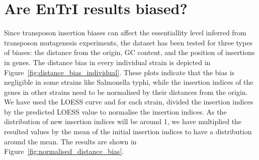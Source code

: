 \documentclass[a4paper,10pt, twocolumn]{article}
\begin{document}
\section{Are EnTrI results biased?}
Since transposon insertion biases can affect the essentiallity level inferred from transposon mutagenesis experiments, the dataset has been tested for three types of biases: the distance from the origin, GC content, and the position of insertions in genes. The distance bias in every individual strain is depicted in Figure~\ref{fig:distance_bias_individual}. These plots indicate that the bias is negligible in some strains like Salmonella typhi, while the insertion indices of the genes in other strains need to be normalised by their distances from the origin. We have used the LOESS curve and for each strain, divided the insertion indices by the predicted LOESS value to normalise the insertion indices. As the distribution of new insertion indices will be around 1, we have multiplied the resulted values by the mean of the initial insertion indices to have a distribution around the mean. The results are shown in Figure~\ref{fig:normalised_distance_bias}.
\end{document}
